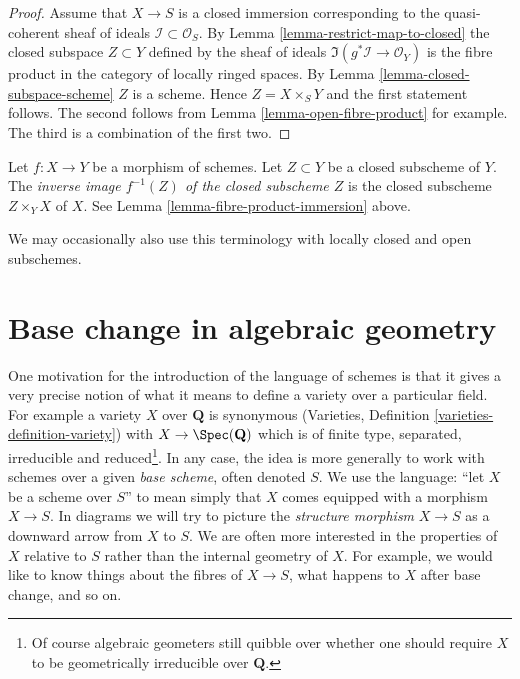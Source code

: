 \begin{proof}
Assume that $X \to S$ is a closed immersion corresponding
to the quasi-coherent sheaf of ideals $\mathcal{I} \subset \mathcal{O}_S$.
By Lemma \ref{lemma-restrict-map-to-closed} the closed subspace
$Z \subset Y$ defined by the sheaf of ideals
$\Im(g^*\mathcal{I} \to \mathcal{O}_Y)$ is the fibre product
in the category of locally ringed spaces.
By Lemma \ref{lemma-closed-subspace-scheme} $Z$ is a scheme.
Hence $Z = X \times_S Y$ and the first statement follows.
The second follows from Lemma \ref{lemma-open-fibre-product}
for example. The third is a combination of
the first two.
\end{proof}

\begin{definition}
\label{definition-inverse-image-closed-subscheme}
Let $f : X \to Y$ be a morphism of schemes. Let $Z \subset Y$ be a
closed subscheme of $Y$. The {\it inverse image $f^{-1}(Z)$ of the
closed subscheme $Z$} is the closed subscheme $Z \times_Y X$ of
$X$. See Lemma \ref{lemma-fibre-product-immersion} above.
\end{definition}

\noindent
We may occasionally also use this terminology with locally closed and
open subschemes.









\section{Base change in algebraic geometry}
\label{section-base-change}

\noindent
One motivation for the introduction of the language of schemes
is that it gives a very precise notion of what it means to
define a variety over a particular field. For example a variety
$X$ over $\mathbf{Q}$ is synonymous
(Varieties, Definition \ref{varieties-definition-variety})
with $X \to \Spec(\mathbf{Q})$ which is of finite type,
separated, irreducible and reduced\footnote{Of course algebraic
geometers still quibble over whether one should require $X$ to be
geometrically irreducible over $\mathbf{Q}$.}. In any case, the idea
is more generally to work with schemes over a given {\it base scheme},
often denoted $S$. We use the language: ``let $X$ be a scheme over $S$''
to mean simply that $X$ comes equipped with a morphism $X \to S$.
In diagrams we will try to picture the {\it structure morphism}
$X \to S$ as a downward arrow from $X$ to $S$.
We are often more interested in the properties of $X$ relative
to $S$ rather than the internal geometry of $X$.
For example, we would like to know things about the fibres of $X \to S$,
what happens to $X$ after base change, and so on.

